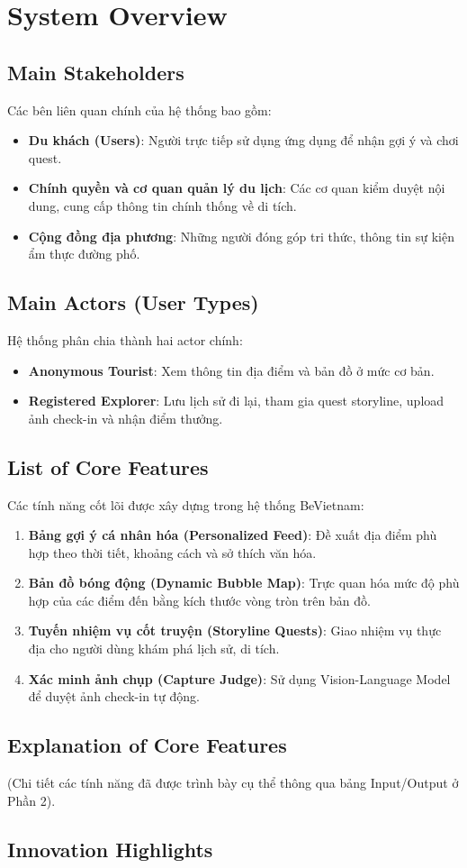 \section{System Overview}

\subsection{Main Stakeholders}

Các bên liên quan chính của hệ thống bao gồm:
\begin{itemize}
    \item \textbf{Du khách (Users)}: Người trực tiếp sử dụng ứng dụng để nhận gợi ý và chơi quest.
    \item \textbf{Chính quyền và cơ quan quản lý du lịch}: Các cơ quan kiểm duyệt nội dung, cung cấp thông tin chính thống về di tích.
    \item \textbf{Cộng đồng địa phương}: Những người đóng góp tri thức, thông tin sự kiện ẩm thực đường phố.
\end{itemize}

\subsection{Main Actors (User Types)}

Hệ thống phân chia thành hai actor chính:
\begin{itemize}
    \item \textbf{Anonymous Tourist}: Xem thông tin địa điểm và bản đồ ở mức cơ bản.
    \item \textbf{Registered Explorer}: Lưu lịch sử đi lại, tham gia quest storyline, upload ảnh check-in và nhận điểm thưởng.
\end{itemize}

\subsection{List of Core Features}

Các tính năng cốt lõi được xây dựng trong hệ thống BeVietnam:
\begin{enumerate}
    \item \textbf{Bảng gợi ý cá nhân hóa (Personalized Feed)}: Đề xuất địa điểm phù hợp theo thời tiết, khoảng cách và sở thích văn hóa.
    \item \textbf{Bản đồ bóng động (Dynamic Bubble Map)}: Trực quan hóa mức độ phù hợp của các điểm đến bằng kích thước vòng tròn trên bản đồ.
    \item \textbf{Tuyến nhiệm vụ cốt truyện (Storyline Quests)}: Giao nhiệm vụ thực địa cho người dùng khám phá lịch sử, di tích.
    \item \textbf{Xác minh ảnh chụp (Capture Judge)}: Sử dụng Vision-Language Model để duyệt ảnh check-in tự động.
\end{enumerate}

\subsection{Explanation of Core Features}

(Chi tiết các tính năng đã được trình bày cụ thể thông qua bảng Input/Output ở Phần 2).

\subsection{Innovation Highlights}


